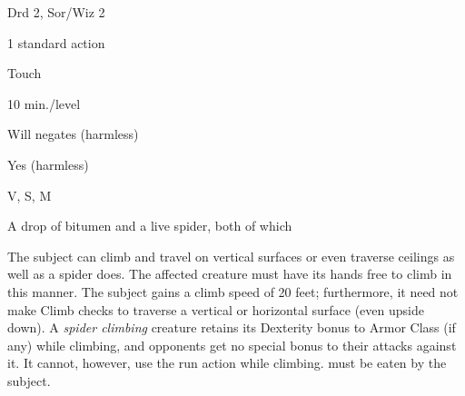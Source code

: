 
\begin{description*}
\item[Level:] Drd 2, Sor/Wiz 2
\item[Casting Time:] 1 standard action
\item[Range:] Touch
\item[Duration:] 10 min./level
\item[Saving Throw:] Will negates (harmless)
\item[Spell Resistance:] Yes (harmless)
\item[Components:] V, S, M
\item[Arcane Material Component:] A drop of bitumen and a live spider, both of which
\end{description*}

The subject can climb and travel on vertical surfaces or even traverse ceilings
as well as a spider does. The affected creature must have its hands free to climb
in this manner. The subject gains a climb speed of 20 feet; furthermore, it need
not make Climb checks to traverse a vertical or horizontal surface (even upside
down). A \textit{spider climbing} creature retains its Dexterity bonus to Armor
Class (if any) while climbing, and opponents get no special bonus to their attacks
against it. It cannot, however, use the run action while climbing.
must be eaten by the subject.